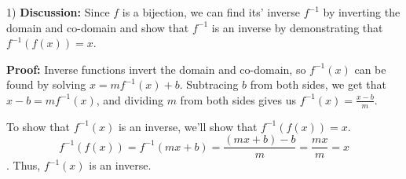 \begin{paragraph}{1)}
    \textbf{Discussion:} Since $f$ is a bijection, we can find its' inverse
    $f^{-1}$ by inverting the domain and co-domain and show that $f^{-1}$ is 
    an inverse by demonstrating that $f^{-1}(f(x)) = x$.
    \spacing

    \textbf{Proof:} Inverse functions invert the domain and co-domain,
    so $f^{-1}(x)$ can be found by solving $x = mf^{-1}(x) + b$. Subtracing $b$
    from both sides, we get that $x - b = mf^{-1}(x)$, and dividing $m$ from 
    both sides gives us $f^{-1}(x) = \frac{x - b}{m}$.
    \spacing

    To show that $f^{-1}(x)$ is an inverse, we'll show that $f^{-1}(f(x)) = x$.
    $$f^{-1}(f(x)) = f^{-1}(mx + b) = \frac{(mx + b) - b}{m} = \frac{mx}{m} = x$$.
    Thus, $f^{-1}(x)$ is an inverse.
    \proofEnd
    \end{paragraph}
    
    \bigskip

